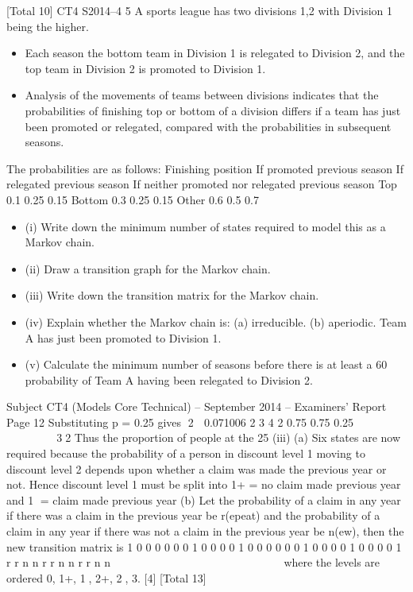 \documentclass[a4paper,12pt]{article}
\begin{document}
[Total 10]
CT4 S2014–4
5 A sports league has two divisions {1,2} with Division 1 being the higher. 
\begin{itemize}
    \item Each
season the bottom team in Division 1 is relegated to Division 2, and the top team in
Division 2 is promoted to Division 1.
\item Analysis of the movements of teams between divisions indicates that the probabilities
of finishing top or bottom of a division differs if a team has just been promoted or
relegated, compared with the probabilities in subsequent seasons.
\end{itemize}
The probabilities are as follows:
  Finishing
position
If promoted
previous season
If relegated
previous season
If neither promoted
nor relegated
previous season
Top 0.1 0.25 0.15
Bottom 0.3 0.25 0.15
Other 0.6 0.5 0.7
\begin{itemize}
\item (i) Write down the minimum number of states required to model this as a Markov
chain. 
\item (ii) Draw a transition graph for the Markov chain. 
\item (iii) Write down the transition matrix for the Markov chain. 
\item (iv) Explain whether the Markov chain is:
  (a) irreducible.
(b) aperiodic. 
Team A has just been promoted to Division 1.
\item (v) Calculate the minimum number of seasons before there is at least a 60%
probability of Team A having been relegated to Division 2. 
\end{itemize}


Subject CT4 (Models Core Technical) – September 2014 – Examiners’ Report
Page 12
Substituting p = 0.25 gives 2  0.071006
2
3 4 2
0.75 0.75
0.25
        
 
 32
Thus the proportion of people at the 25%
(iii) (a) Six states are now required
because the probability of a person in discount level 1 moving to
discount level 2 depends upon whether a claim was made the previous
year or not.
Hence discount level 1 must be split into
1+ = no claim made previous year and
1 = claim made previous year
(b) Let the probability of a claim in any year if there was a claim in the
previous year be r(epeat) and the probability of a claim in any year if
there was not a claim in the previous year be n(ew), then the new
transition matrix is
1 0 0 0 0
0 0 1 0 0
0 0 1 0 0
0 0 0 0 1
0 0 0 0 1
0 0 0 0 1
r r
n n
r r
n n
r r
n n
  
    
  
 
  
  
    
where the levels are ordered 0, 1+, 1, 2+, 2, 3. [4]
[Total 13]


\end{document}
